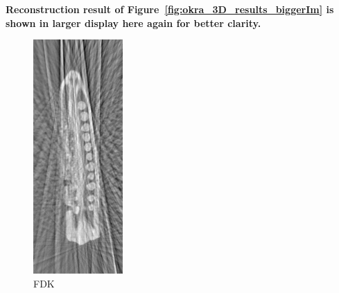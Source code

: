 \documentclass{article}
\begin{document}
\textbf{Reconstruction result of Figure~\ref{fig:okra_3D_results_biggerIm}  is shown in larger display here  again for better clarity.}
\begin{figure}[!h]
\centering
       \includegraphics[width=0.5\columnwidth]{../images/okra/fdk_cropped.png}
\captionsetup{labelformat=empty}
        \caption{\large{FDK}}
\end{figure}
\newpage
\end{document}
